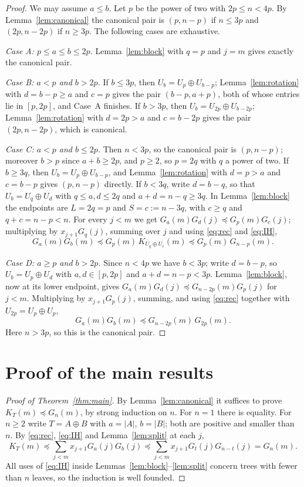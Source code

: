 \documentclass[11pt]{amsart}
\theoremstyle{definition}
\theoremstyle{remark}
\newcommand{\pre}{\preceq}
\begin{document}
\begin{proof}
We may assume $a\le b$.
Let $p$ be the power of two with $2p\le n<4p$.
By Lemma~\ref{lem:canonical} the canonical pair is $(p,n-p)$ if $n\le 3p$ and $(2p,n-2p)$ if $n\ge 3p$.
The following cases are exhaustive.

\emph{Case A: $p\le a\le b\le 2p$.}
Lemma~\ref{lem:block} with $q=p$ and $j=m$ gives exactly the canonical pair.

\emph{Case B: $a<p$ and $b>2p$.}
If $b\le 3p$, then $U_b=U_p\oplus U_{b-p}$; Lemma~\ref{lem:rotation} with $d=b-p\ge a$ and $c=p$ gives the pair $(b-p,a+p)$, both of whose entries lie in $[p,2p]$, and Case~A finishes.
If $b>3p$, then $U_b=U_{2p}\oplus U_{b-2p}$; Lemma~\ref{lem:rotation} with $d=2p>a$ and $c=b-2p$ gives the pair $(2p,n-2p)$, which is canonical.

\emph{Case C: $a<p$ and $b\le 2p$.}
Then $n<3p$, so the canonical pair is $(p,n-p)$; moreover $b>p$ since $a+b\ge 2p$, and $p\ge2$, so $p=2q$ with $q$ a power of two.
If $b\ge 3q$, then $U_b=U_p\oplus U_{b-p}$, and Lemma~\ref{lem:rotation} with $d=p>a$ and $c=b-p$ gives $(p,n-p)$ directly.
If $b<3q$, write $d=b-q$, so that $U_b=U_q\oplus U_d$ with $q\le a,d\le 2q$ and $a+d=n-q\ge 3q$.
In Lemma~\ref{lem:block} the endpoints are $L=2q=p$ and $S=c:=n-3q$, with $c\ge q$ and $q+c=n-p<n$.
For every $j<m$ we get $G_a(m)G_d(j)\pre G_p(m)G_c(j)$; multiplying by $x_{j+1}G_q(j)$, summing over $j$ and using \eqref{eq:rec} and \eqref{eq:IH},
\[
G_a(m)G_b(m)\pre G_p(m)\,K_{U_q\oplus U_c}(m)\pre G_p(m)\,G_{n-p}(m).
\]

\emph{Case D: $a\ge p$ and $b>2p$.}
Since $n<4p$ we have $b<3p$; write $d=b-p$, so $U_b=U_p\oplus U_d$ with $a,d\in[p,2p]$ and $a+d=n-p<3p$.
Lemma~\ref{lem:block}, now at its lower endpoint, gives $G_a(m)G_d(j)\pre G_{n-2p}(m)G_p(j)$ for $j<m$.
Multiplying by $x_{j+1}G_p(j)$, summing, and using \eqref{eq:rec} together with $U_{2p}=U_p\oplus U_p$,
\[
G_a(m)G_b(m)\pre G_{n-2p}(m)\,G_{2p}(m).
\]
Here $n>3p$, so this is the canonical pair.
\end{proof}

\section{Proof of the main results}\label{sec:proofs}

\begin{proof}[Proof of Theorem~\ref{thm:main}]
By Lemma~\ref{lem:canonical} it suffices to prove $K_T(m)\pre G_n(m)$, by strong induction on $n$.
For $n=1$ there is equality.
For $n\ge2$ write $T=A\oplus B$ with $a=|A|$, $b=|B|$; both are positive and smaller than $n$.
By \eqref{eq:rec}, \eqref{eq:IH} and Lemma~\ref{lem:split} at each $j$,
\[
K_T(m)\pre\sum_{j<m}x_{j+1}G_a(j)G_b(j)\pre\sum_{j<m}x_{j+1}G_t(j)G_{n-t}(j)=G_n(m).
\]
All uses of \eqref{eq:IH} inside Lemmas~\ref{lem:block}--\ref{lem:split} concern trees with fewer than $n$ leaves, so the induction is well founded.
\end{proof}
\end{document}
